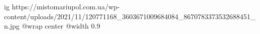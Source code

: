  
 
 
 
 

\ifcmt
  ig https://mistomariupol.com.ua/wp-content/uploads/2021/11/120771168_3603671009684084_8670783373532688451_n.jpg
  @wrap center
  @width 0.9
\fi
